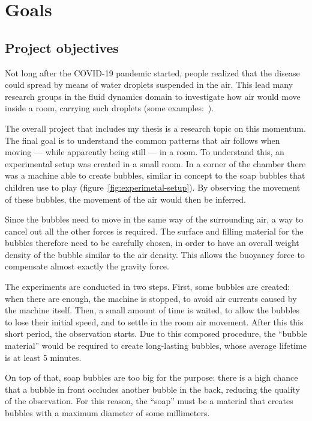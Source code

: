 \chapter{Goals}
\label{chap:goal}

\section{Project objectives}

Not long after the COVID-19 pandemic started, people realized that the disease could spread by means of water droplets suspended in the air.
This lead many research groups in the fluid dynamics domain to investigate how air would move inside a room, carrying such droplets (some examples:~\cite{covid-air-1}\cite{covid-air-2}).

The overall project that includes my thesis is a research topic on this momentum.
The final goal is to understand the common patterns that air follows when moving --- while apparently being still --- in a room.
To understand this, an experimental setup was created in a small room.
In a corner of the chamber there was a machine able to create bubbles, similar in concept to the soap bubbles that children use to play (figure~\ref{fig:experimetal-setup}). By observing the movement of these bubbles, the movement of the air would then be inferred.

Since the bubbles need to move in the same way of the surrounding air, a way to cancel out all the other forces is required.
The surface and filling material for the bubbles therefore need to be carefully chosen, in order to have an overall weight density of the bubble similar to the air density.
This allows the buoyancy force to compensate almost exactly the gravity force.

The experiments are conducted in two steps.
First, some bubbles are created: when there are enough, the machine is stopped, to avoid air currents caused by the machine itself.
Then, a small amount of time is waited, to allow the bubbles to lose their initial speed, and to settle in the room air movement.
After this this short period, the observation starts.
Due to this composed procedure, the ``bubble material'' would be required to create long-lasting bubbles, whose average lifetime is at least 5 minutes.

On top of that, soap bubbles are too big for the purpose: there is a high chance that a bubble in front occludes another bubble in the back, reducing the quality of the observation.
For this reason, the ``soap'' must be a material that creates bubbles with a maximum diameter of some millimeters.

